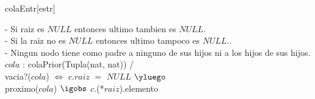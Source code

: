 \begin{Representacion}
 
  \begin{Estructura}{colaEntr}[estr]
      \begin{Tupla}[estr]%
    \end{Tupla}
  \end{Estructura}

	\begin{Tupla}[Nodoheap]
	\end{Tupla}

	\begin{Tupla}[entrenador]
	\end{Tupla}


	
- Si raiz es $NULL$ entonces ultimo tambien es $NULL$. \\
- Si la raiz no es $NULL$ entonces ultimo tampoco es $NULL$.. \\
- Ningun nodo tiene como padre a ninguno de sus hijos ni a los hijos de sus hijos. \\ 


%
{
$cola$ : colaPrior(Tupla(nat, nat)) / \\
	vacia?($cola$)  $\iff$  $c$.$raiz$ $=$ $NULL$ $\yluego$ \\
	proximo($cola$) $\igobs$ $c$.(*$raiz$).elemento \\
	
}%

\end{Representacion}

